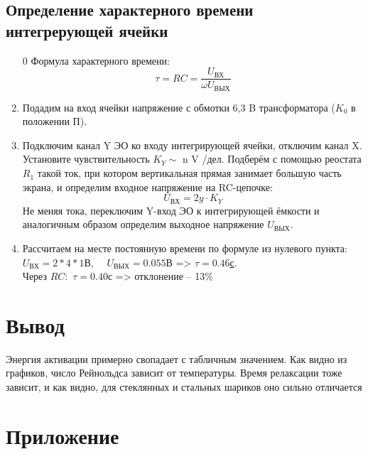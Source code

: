 \documentclass[14pt,a4paper]{article}
\begin{document}
\subsection*{Определение характерного времени интегрерующей ячейки}\begin{enumerate}
  \item[0] Формула характерного времени:
  $$\tau = RC = \frac{U_\text{ВХ}}{\omega U_\text{ВЫХ}}$$
  \item Подадим на вход ячейки
  напряжение с обмотки 6,3 B трансформатора ($K_0$ в положении П).
  \item Подключим канал Y ЭО ко входу интегрирующей ячейки, отключим канал X. Установите чувствительность $K_Y \sim$ n V /дел. Подберём с помощью реостата $R_1$ такой ток, при котором вертикальная прямая занимает
  большую часть экрана, и определим входное напряжение на RC-цепочке:
  $$U_\text{ВХ} = 2y \cdot K_Y$$
  Не меняя тока, переключим Y-вход ЭО к интегрирующей ёмкости и
  аналогичным образом определим выходное напряжение $U_\text{ВЫХ}$.
  \item  Рассчитаем на месте постоянную времени по формуле из нулевого пункта:\\
  $U_\text{ВХ} = 2 * 4 * 1$В, \ \  $U_\text{ВЫХ} = 0.055$В => \underline{$\tau = 0.46$с}.\\
  Через $RC:$ $\tau = 0.40$с => отклонение -- 13\%
\end{enumerate}

\section*{Вывод}
Энергия активации примерно свопадает с табличным значением.
Как видно из графиков, число Рейнольдса зависит от температуры.
Время релаксации тоже зависит, и как видно, для стеклянных и стальных шариков оно сильно отличается

\newpage
\section*{Приложение}
\end{document}
